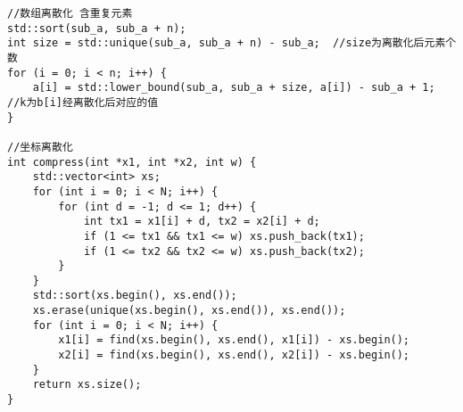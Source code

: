 \begin{lstlisting}
//数组离散化 含重复元素
std::sort(sub_a, sub_a + n);
int size = std::unique(sub_a, sub_a + n) - sub_a;  //size为离散化后元素个数
for (i = 0; i < n; i++) {
	a[i] = std::lower_bound(sub_a, sub_a + size, a[i]) - sub_a + 1;  //k为b[i]经离散化后对应的值
}

//坐标离散化
int compress(int *x1, int *x2, int w) {
	std::vector<int> xs;
	for (int i = 0; i < N; i++) {
		for (int d = -1; d <= 1; d++) {
			int tx1 = x1[i] + d, tx2 = x2[i] + d;
			if (1 <= tx1 && tx1 <= w) xs.push_back(tx1);
			if (1 <= tx2 && tx2 <= w) xs.push_back(tx2);
		}
	}
	std::sort(xs.begin(), xs.end());
	xs.erase(unique(xs.begin(), xs.end()), xs.end());
	for (int i = 0; i < N; i++) {
		x1[i] = find(xs.begin(), xs.end(), x1[i]) - xs.begin();
		x2[i] = find(xs.begin(), xs.end(), x2[i]) - xs.begin();
	}
	return xs.size();
}
\end{lstlisting}